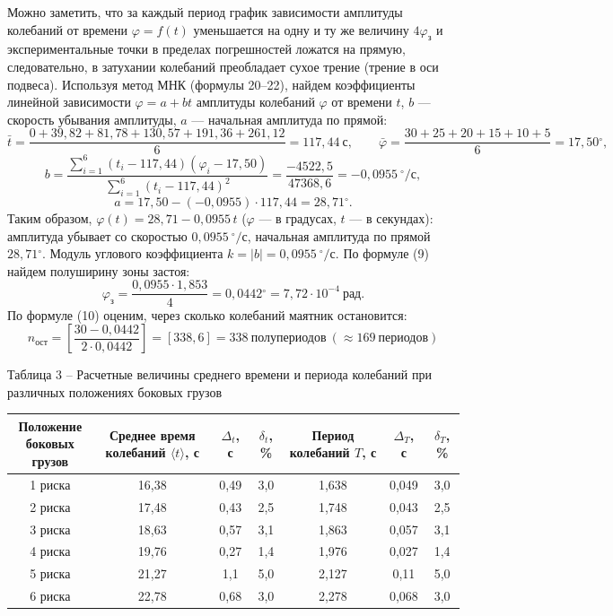 \documentclass[11pt,a4paper]{article}
\newcommand{\gr}{\ensuremath{^\circ}}
\newcommand{\sub}[1]{\text{#1}}
\begin{document}
Можно заметить, что за каждый период график зависимости амплитуды колебаний от времени $\varphi=f(t)$ уменьшается на одну и ту же величину $4\varphi_\sub{з}$ и экспериментальные точки в пределах погрешностей ложатся на прямую, следовательно, в затухании колебаний преобладает сухое трение (трение в оси подвеса).
\newline
\newline
Используя метод МНК (формулы 20–22), найдем коэффициенты линейной зависимости $\varphi=a+bt$ амплитуды колебаний $\varphi$ от времени $t$, $b$ — скорость убывания амплитуды, $a$ — начальная амплитуда по прямой:
\[
\bar t=\frac{0+39,82+81,78+130,57+191,36+261,12}{6}=117,44\ \text{с},\qquad
\bar\varphi=\frac{30+25+20+15+10+5}{6}=17,50\gr,
\]
\[
b=\frac{\sum\limits_{i=1}^{6}(t_i-117,44)(\varphi_i-17,50)}{\sum\limits_{i=1}^{6}(t_i-117,44)^2}
=\frac{-4522,5}{47368,6}=-0,0955\ {}^\circ/\text{с},
\]
\[
a=17,50-(-0,0955)\cdot117,44=28,71\gr.
\]
Таким образом, $\varphi(t)=28,71-0,0955\,t$ ($\varphi$ — в градусах, $t$ — в секундах): амплитуда убывает со скоростью
$0,0955\ {}^\circ/\text{с}$, начальная амплитуда по прямой $28,71\gr$.
Модуль углового коэффициента $k=|b|=0,0955\ {}^\circ/\text{с}$. По формуле (9) найдем полуширину зоны застоя:
\[
\varphi_\sub{з}=\frac{0,0955\cdot1,853}{4}=0,0442\gr=7,72\cdot10^{-4}\ \text{рад}.
\]
По формуле (10) оценим, через сколько колебаний маятник остановится:
\[
n_\sub{ост}=\left[\frac{30-0,0442}{2\cdot0,0442}\right]=[338,6]=338\ \text{полупериодов}\ (\approx169\ \text{периодов})
\]

\begin{center}
Таблица 3 – Расчетные величины среднего времени и периода колебаний при различных положениях боковых грузов\\[3pt]
\begin{tabular}{|c|c|c|c|c|c|c|}
\hline
\makecell{Положение\\боковых грузов} & \makecell{Среднее время\\колебаний $\langle t\rangle$, с} & $\Delta_t$, с & $\delta_t$, \% & \makecell{Период\\колебаний $T$, с} & $\Delta_T$, с & $\delta_T$, \%\\\hline
1 риска & 16,38 & 0,49 & 3,0 & 1,638 & 0,049 & 3,0\\\hline
2 риска & 17,48 & 0,43 & 2,5 & 1,748 & 0,043 & 2,5\\\hline
3 риска & 18,63 & 0,57 & 3,1 & 1,863 & 0,057 & 3,1\\\hline
4 риска & 19,76 & 0,27 & 1,4 & 1,976 & 0,027 & 1,4\\\hline
5 риска & 21,27 & 1,1 & 5,0 & 2,127 & 0,11 & 5,0\\\hline
6 риска & 22,78 & 0,68 & 3,0 & 2,278 & 0,068 & 3,0\\\hline
\end{tabular}
\end{center}
\end{document}
